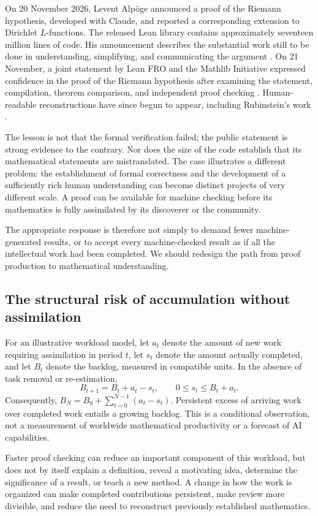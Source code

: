 \documentclass[11pt,a4paper]{article}
\theoremstyle{definition}\newtheorem{definition}{Definition}
\begin{document}
On 20 November 2026, Levent Alp\"oge announced a proof of the Riemann hypothesis, developed with Claude, and reported a corresponding extension to Dirichlet $L$-functions. The released Lean library contains approximately seventeen million lines of code. His announcement describes the substantial work still to be done in understanding, simplifying, and communicating the argument \cite{alpoge}. On 21 November, a joint statement by Lean FRO and the Mathlib Initiative expressed confidence in the proof of the Riemann hypothesis after examining the statement, compilation, theorem comparison, and independent proof checking \cite{rh}. Human-readable reconstructions have since begun to appear, including Rubinstein's work \cite{rubinstein}.

The lesson is not that the formal verification failed; the public statement is strong evidence to the contrary. Nor does the size of the code establish that its mathematical statements are mistranslated. The case illustrates a different problem: the establishment of formal correctness and the development of a sufficiently rich human understanding can become distinct projects of very different scale. A proof can be available for machine checking before its mathematics is fully assimilated by its discoverer or the community.

The appropriate response is therefore not simply to demand fewer machine-generated results, or to accept every machine-checked result as if all the intellectual work had been completed. We should redesign the path from proof production to mathematical understanding.

\subsection{The structural risk of accumulation without assimilation}
For an illustrative workload model, let $a_t$ denote the amount of new work requiring assimilation in period $t$, let $s_t$ denote the amount actually completed, and let $B_t$ denote the backlog, measured in compatible units. In the absence of task removal or re-estimation,
\[
 B_{t+1}=B_t+a_t-s_t,\qquad 0\le s_t\le B_t+a_t.
\]
Consequently, $B_N=B_0+\sum_{t=0}^{N-1}(a_t-s_t)$. Persistent excess of arriving work over completed work entails a growing backlog. This is a conditional observation, not a measurement of worldwide mathematical productivity or a forecast of AI capabilities.

Faster proof checking can reduce an important component of this workload, but does not by itself explain a definition, reveal a motivating idea, determine the significance of a result, or teach a new method. A change in how the work is organized can make completed contributions persistent, make review more divisible, and reduce the need to reconstruct previously established mathematics.
\end{document}
